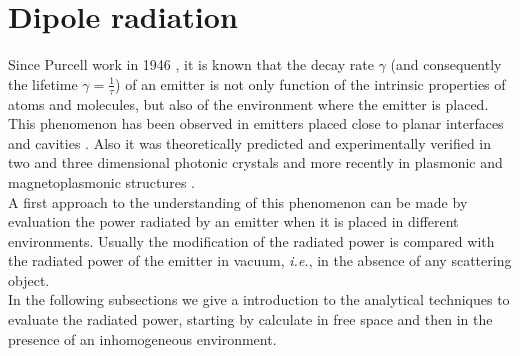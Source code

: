 \section{Dipole radiation\label{chap2:Dipole_radiation}}



Since Purcell work in 1946 \cite{Purcell_1946}, it is known that the decay rate $\gamma$ (and consequently the lifetime $\gamma=\frac{1}{\tau}$) of an emitter is not only function of the intrinsic properties of atoms and molecules, but also of the environment where the emitter is placed.\\ 
 This phenomenon has been observed in emitters placed close to planar interfaces \cite{Drexhage_1966} and cavities \citep{Goy_1983}. Also it was theoretically predicted \cite{yablonovitch1987inhibited} and experimentally verified in two \cite{Kress_2005, Englund_2005} and three dimensional photonic crystals \cite{Lodahl_2004} and more recently in plasmonic \cite{Carminati_2006, Castanie_2012_distance, esteban2014strong} and magnetoplasmonic structures \cite{Nikolova_2013}.\\
A first approach to the understanding of this phenomenon can be made by evaluation the power radiated by an emitter when it is placed in different environments. Usually the modification of the radiated power is compared with the radiated power of the emitter in vacuum, \textit{i.e.}, in the absence of any scattering object.\\
In the following subsections we give a introduction to the analytical techniques to evaluate the radiated power, starting by calculate in free space and then in the presence of an inhomogeneous environment.

